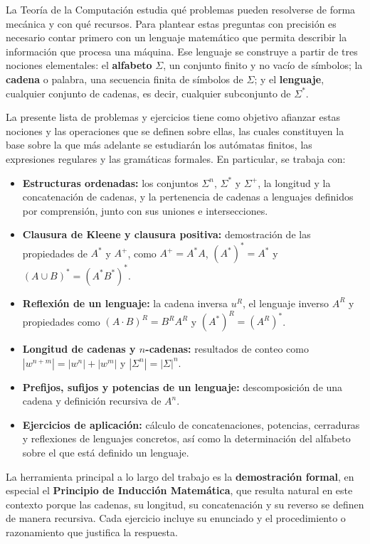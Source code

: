 
La Teoría de la Computación estudia qué problemas pueden resolverse de forma
mecánica y con qué recursos. Para plantear estas preguntas con precisión es
necesario contar primero con un lenguaje matemático que permita describir la
información que procesa una máquina. Ese lenguaje se construye a partir de tres
nociones elementales: el \textbf{alfabeto} $\Sigma$, un conjunto finito y no vacío de
símbolos; la \textbf{cadena} o palabra, una secuencia finita de símbolos de
$\Sigma$; y el \textbf{lenguaje}, cualquier conjunto de cadenas, es decir, cualquier
subconjunto de $\Sigma^*$.

La presente lista de problemas y ejercicios tiene como objetivo afianzar estas
nociones y las operaciones que se definen sobre ellas, las cuales constituyen la
base sobre la que más adelante se estudiarán los autómatas finitos, las
expresiones regulares y las gramáticas formales. En particular, se trabaja con:

\begin{itemize}
    \item \textbf{Estructuras ordenadas:} los conjuntos $\Sigma^n$, $\Sigma^*$ y
    $\Sigma^+$, la longitud y la concatenación de cadenas, y la pertenencia de
    cadenas a lenguajes definidos por comprensión, junto con sus uniones e
    intersecciones.
    \item \textbf{Clausura de Kleene y clausura positiva:} demostración de las
    propiedades de $A^*$ y $A^+$, como $A^+ = A^* A$, $(A^*)^* = A^*$ y
    $(A \cup B)^* = (A^* B^*)^*$.
    \item \textbf{Reflexión de un lenguaje:} la cadena inversa $u^R$, el lenguaje
    inverso $A^R$ y propiedades como $(A \cdot B)^R = B^R A^R$ y
    $(A^*)^R = (A^R)^*$.
    \item \textbf{Longitud de cadenas y $n$-cadenas:} resultados de conteo como
    $|w^{n+m}| = |w^n| + |w^m|$ y $|\Sigma^n| = |\Sigma|^n$.
    \item \textbf{Prefijos, sufijos y potencias de un lenguaje:} descomposición de
    una cadena y definición recursiva de $A^n$.
    \item \textbf{Ejercicios de aplicación:} cálculo de concatenaciones, potencias,
    cerraduras y reflexiones de lenguajes concretos, así como la
    determinación del alfabeto sobre el que está definido un lenguaje.
\end{itemize}

La herramienta principal a lo largo del trabajo es la \textbf{demostración formal},
en especial el \textbf{Principio de Inducción Matemática}, que resulta natural en
este contexto porque las cadenas, su longitud, su concatenación y su reverso se
definen de manera recursiva. Cada ejercicio incluye su enunciado y el
procedimiento o razonamiento que justifica la respuesta.
